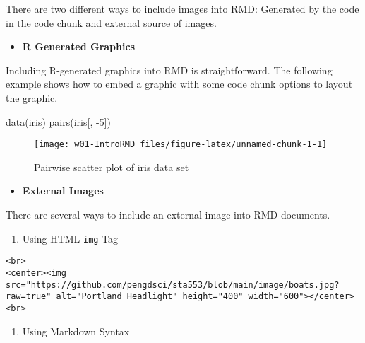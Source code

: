 \documentclass[
]{article}
\newenvironment{Shaded}{\begin{snugshade}}{\end{snugshade}}
\newcommand{\DecValTok}[1]{\textcolor[rgb]{0.00,0.00,0.81}{#1}}
\newcommand{\FunctionTok}[1]{\textcolor[rgb]{0.00,0.00,0.00}{#1}}
\newcommand{\NormalTok}[1]{#1}
\newcommand{\SpecialCharTok}[1]{\textcolor[rgb]{0.00,0.00,0.00}{#1}}
\providecommand{\tightlist}{%
  \setlength{\itemsep}{0pt}\setlength{\parskip}{0pt}}
\begin{document}
There are two different ways to include images into RMD: Generated by
the code in the code chunk and external source of images.

\begin{itemize}
\tightlist
\item
  \textbf{R Generated Graphics}
\end{itemize}

Including R-generated graphics into RMD is straightforward. The
following example shows how to embed a graphic with some code chunk
options to layout the graphic.

\begin{Shaded}
\begin{Highlighting}[]
\FunctionTok{data}\NormalTok{(iris)}
\FunctionTok{pairs}\NormalTok{(iris[, }\SpecialCharTok{{-}}\DecValTok{5}\NormalTok{])}
\end{Highlighting}
\end{Shaded}

\begin{figure}

{\centering \texttt{[image: w01-IntroRMD\_files/figure-latex/unnamed-chunk-1-1]} 

}

\caption{Pairwise scatter plot of iris data set}\label{fig:unnamed-chunk-1}
\end{figure}

\begin{itemize}
\tightlist
\item
  \textbf{External Images}
\end{itemize}

There are several ways to include an external image into RMD documents.

\begin{enumerate}
\def\labelenumi{\arabic{enumi}.}
\tightlist
\item
  Using HTML \texttt{img} Tag
\end{enumerate}

\begin{verbatim}
<br>
<center><img src="https://github.com/pengdsci/sta553/blob/main/image/boats.jpg?raw=true" alt="Portland Headlight" height="400" width="600"></center>
<br>
\end{verbatim}

\begin{enumerate}
\def\labelenumi{\arabic{enumi}.}
\setcounter{enumi}{1}
\tightlist
\item
  Using Markdown Syntax
\end{enumerate}
\end{document}
